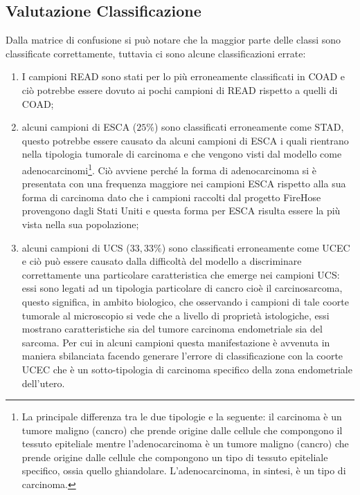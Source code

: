 \subsection{Valutazione Classificazione}
\label{subsec:class-val-varnet}
Dalla matrice di confusione si può notare che la maggior parte delle classi sono classificate correttamente, tuttavia 
ci sono alcune classificazioni errate: 
\begin{enumerate}
    \item I campioni READ sono stati per lo più erroneamente classificati in COAD e ciò
          potrebbe essere dovuto ai pochi campioni di READ rispetto a quelli di COAD;
    \item alcuni campioni di ESCA ($25\%$) sono classificati erroneamente come STAD, questo potrebbe essere causato da
          alcuni campioni di ESCA i quali rientrano nella tipologia tumorale di carcinoma e che vengono visti dal
          modello come adenocarcinomi\footnote{La principale differenza tra le due tipologie e la seguente: 
          il carcinoma è un tumore maligno (cancro) che prende origine dalle cellule che compongono il tessuto
          epiteliale mentre l'adenocarcinoma è un tumore maligno (cancro) che prende origine dalle cellule che
          compongono un tipo di tessuto epiteliale specifico, ossia quello ghiandolare. L’adenocarcinoma, in sintesi, 
          è un tipo di carcinoma.}. Ciò avviene perché la forma di adenocarcinoma si è presentata con una frequenza
          maggiore nei campioni ESCA rispetto alla sua forma di carcinoma dato che i campioni raccolti dal progetto
          FireHose provengono dagli Stati Uniti e questa forma per ESCA risulta essere la più vista nella sua
          popolazione;
    \item alcuni campioni di UCS ($33,33\%$) sono classificati erroneamente come UCEC e ciò può essere causato dalla 
          difficoltà del modello a discriminare correttamente una particolare caratteristica che emerge nei campioni
          UCS: essi sono legati ad un tipologia particolare di cancro cioè il carcinosarcoma, questo significa, 
          in ambito biologico, che osservando i campioni di tale coorte tumorale al microscopio si vede che a 
          livello di proprietà istologiche, essi mostrano caratteristiche sia del tumore carcinoma endometriale sia 
          del sarcoma. Per cui in alcuni campioni questa manifestazione è avvenuta in maniera sbilanciata facendo
          generare l'errore di classificazione con la coorte UCEC che è un sotto-tipologia di carcinoma specifico 
          della zona endometriale dell'utero.
\end{enumerate}

